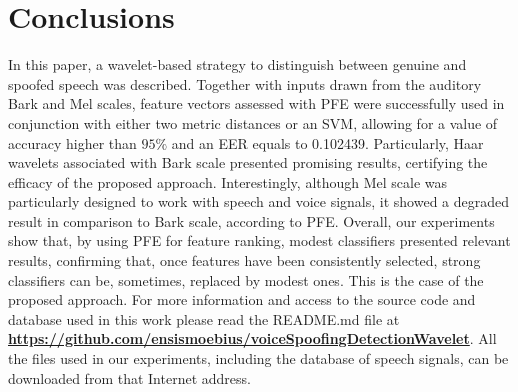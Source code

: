 \section{Conclusions}
\label{sec:conclusions}
\par In this paper, a wavelet-based strategy to distinguish between genuine and spoofed speech was described. Together with inputs drawn  from the auditory Bark and Mel scales, feature vectors assessed with PFE were successfully used in conjunction with either two metric distances or an SVM, allowing for a value of accuracy higher than $95\%$ and an EER equals to 0.102439. Particularly, Haar wavelets associated with Bark scale presented promising results, certifying the efficacy of the proposed approach. Interestingly, although Mel scale was particularly designed to work with speech and voice signals, it showed a degraded result in comparison to Bark scale, according to PFE. Overall, our experiments show that, by using PFE for feature ranking, modest classifiers presented relevant results, confirming that, once features have been consistently selected, strong classifiers can be, sometimes, replaced by modest ones. This is the case of the proposed approach. For more information and access to the source code and database used in this work please read the README.md file at \href{https://github.com/ensismoebius/voiceSpoofingDetectionWavelet}{\textbf{https://github.com/ensismoebius/voiceSpoofingDetectionWavelet}}. All the files used in our experiments, including the database of speech signals, can be downloaded from that Internet address. 
